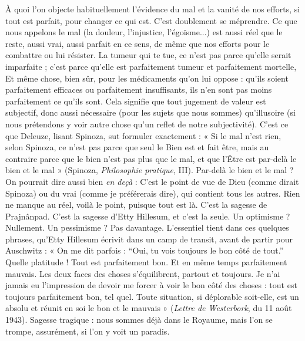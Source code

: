 À quoi l’on objecte habituellement l’évidence du mal et la vanité de nos
efforts, si tout est parfait, pour changer ce qui est. C’est doublement se
méprendre. Ce que nous appelons le mal (la douleur, l'injustice, l’égoïsme...)
est aussi réel que le reste, aussi vrai, aussi parfait en ce sens, de même que nos
efforts pour le combattre ou lui résister. La tumeur qui te tue, ce n’est pas parce
qu’elle serait imparfaite ; c’est parce qu’elle est parfaitement tumeur et parfaitement
mortelle, Et même chose, bien sûr, pour les médicaments qu’on lui
oppose : qu’ils soient parfaitement efficaces ou parfaitement insuffisants, ils
n'en sont pas moins parfaitement ce qu’ils sont. Cela signifie que tout jugement
de valeur est subjectif, donc aussi nécessaire (pour les sujets que nous
sommes) qu’illusoire (si nous prétendons y voir autre chose qu’un reflet de
notre subjectivité). C’est ce que Deleuze, lisant Spinoza, sut formuler
exactement : « Si le mal n’est rien, selon Spinoza, ce n’est pas parce que seul le
Bien est et fait être, mais au contraire parce que le bien n’est pas plus que le
mal, et que l’Être est par-delà le bien et le mal » (Spinoza, {\it Philosophie pratique},
III). Par-delà le bien et le mal ? On pourrait dire aussi bien {\it en deçà} : C'est le
point de vue de Dieu (comme dirait Spinoza) ou du vrai (comme je préférerais
dire), qui contient tous les autres. Rien ne manque au réel, voilà le point,
puisque tout est là. C’est la sagesse de Prajnânpad. C’est la sagesse d’Etty
Hillesum, et c’est la seule. Un optimisme ? Nullement. Un pessimisme ? Pas
davantage. L'essentiel tient dans ces quelques phrases, qu’Etty Hillesum écrivit
dans un camp de transit, avant de partir pour Auschwitz : « On me dit parfois :
“Oui, tu vois toujours le bon côté de tout.” Quelle platitude ! Tout est parfaitement
bon. Et en même temps parfaitement mauvais. Les deux faces des
choses s’équilibrent, partout et toujours. Je n’ai jamais eu l’impression de
devoir me forcer à voir le bon côté des choses : tout est toujours parfaitement
bon, tel quel. Toute situation, si déplorable soit-elle, est un absolu et réunit en
soi le bon et le mauvais » ({\it Lettre de Westerbork}, du 11 août 1943). Sagesse
tragique : nous sommes déjà dans le Royaume, mais l’on se trompe, assurément,
si l’on y voit un paradis.

